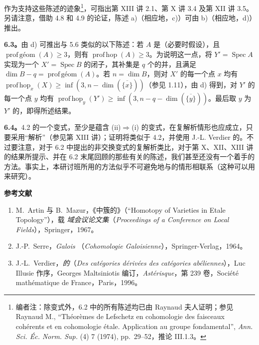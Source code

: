 作为支持这些陈述的迹象\footnote{编者注：除变式外，6.2 中的所有陈述均已由 Raynaud 夫人证明；参见 Raynaud M., ``Théorèmes de Lefschetz en cohomologie des faisceaux cohérents et en cohomologie étale. Application au groupe fondamental'', \emph{Ann. Sci. Éc. Norm. Sup.} (4) 7 (1974), pp.~29--52，推论 III.1.3。}，可指出第 XIII 讲 2.1、第 X 讲 3.4 及第 XII 讲 3.5。另请注意，借助 4.8 和 4.9 的论证，陈述 a)（相应地，c)）可由 b)（相应地，d)）推出。

\textbf{6.3。}由 d) 可推出与 5.6 类似的以下陈述：若 $A$ 是（必要时假设），且 $\operatorname{prof\,\text{géom}}(A)\geq3$，则有 $\operatorname{prof\,hop}(A)\geq3$。为说明这一点，将 $Y'=\operatorname{Spec}A$ 实现为一个 $X'=\operatorname{Spec}B$ 的闭子，其补集是 $q$ 个的并，且满足 $\dim B-q=\operatorname{prof\,\text{géom}}(A)$。若 $n=\dim B$，则对 $X'$ 的每一个点 $x$ 均有 $\operatorname{prof\,hop}_x(X)\geq\inf(3,n-\dim(\overline{\{x\}}))$（参见 1.11），由 d) 得到，对 $Y'$ 的每一个点 $y$ 均有 $\operatorname{prof\,hop}_y(Y')\geq\inf(3,n-q-\dim(\overline{\{y\}}))$。最后取 $y$ 为 $Y'$ 的，即得所述结果。

\textbf{6.4。}4.2 的一个变式，至少是蕴含 (ii)$\Rightarrow$(i) 的变式，在复解析情形也应成立，只要采用“解析”（参见第 XIII 讲）；证明将类似于 4.2，并使用 J.-L. Verdier 的。不过要注意，对于 6.2 中提出的非交换变式的复解析类比，对于第 X、XII、XIII 讲的结果所提示、并在 6.2 末尾回顾的那些有关的陈述，我们甚至还没有一个着手的方法。事实上，本研讨班所用的方法似乎不可避免地与的情形相联系（这种可以用来研究）。

\textbf{参考文献}
\begin{enumerate}
\item[{[1]}] M.~Artin 与 B.~Mazur，《中簇的》（``Homotopy of Varieties in Etale Topology''），载 \emph{域会议论文集}（\emph{Proceedings of a Conference on Local Fields}），Springer，1967。
\item[{[2]}] J.-P.~Serre，\emph{Galois }（\emph{Cohomologie Galoisienne}），Springer-Verlag，1964。
\item[{[3]}] J.-L.~Verdier，\emph{的}（\emph{Des catégories dérivées des catégories abéliennes}），Luc Illusie 作序，Georges Maltsiniotis 编订，\emph{Astérisque}，第 239 卷，Société mathématique de France，Paris，1996。
\end{enumerate}
